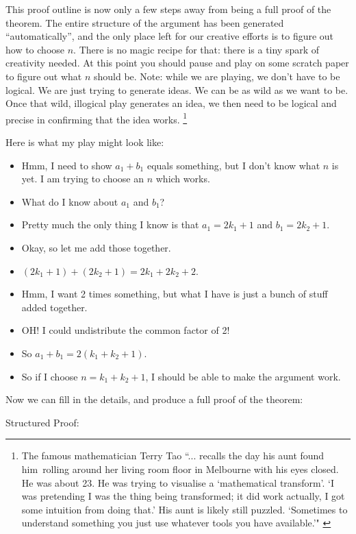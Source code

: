  
This proof outline is now only a few steps away from being a full proof of the theorem.  The entire structure of the argument has been generated ``automatically'', and the only place left for our creative efforts is to figure out how to choose $n$.  There is no magic recipe for that:  there is a tiny spark of creativity needed.  At this point you should pause and play on some scratch paper to figure out what $n$ should be.  Note:  while we are playing, we don't have to be logical.  We are just trying to generate ideas.  We can be as wild as we want to be.  Once that wild, illogical play generates an idea, we then need to be logical and precise in confirming that the idea works. \footnote{The famous mathematician Terry Tao ``... recalls the day his aunt found him rolling around her living room floor in Melbourne with his eyes closed. He was about 23. He was trying to visualise a `mathematical transform'. `I was pretending I was the thing being transformed; it did work actually, I got some intuition from doing that.' His aunt is likely still puzzled. `Sometimes to understand something you just use whatever tools you have available.'" \cite{woo15}}

Here is what my play might look like:

\begin{itemize}
		\item Hmm, I need to show  $a_1+b_1$ equals something, but I don't know what $n$ is yet.  I am trying to choose an $n$ which works.
		\item What do I know about $a_1$ and $b_1$?
		\item Pretty much the only thing I know is that $a_1 = 2k_1+1$ and $b_1 = 2k_2+1$.
		\item Okay, so let me add those together.
		\item $(2k_1+1)+(2k_2+1) = 2k_1+2k_2+2$.
		\item Hmm, I want 2 times something, but what I have is just a bunch of  stuff added together.
		\item OH! I could undistribute the common factor of 2!
		\item So $a_1+b_1 = 2(k_1+k_2+1)$.
		\item So if I choose $n = k_1+k_2+1$, I should be able to make the argument work.
	\end{itemize}

Now we can fill in the details, and produce a full proof of the theorem:

Structured Proof:

